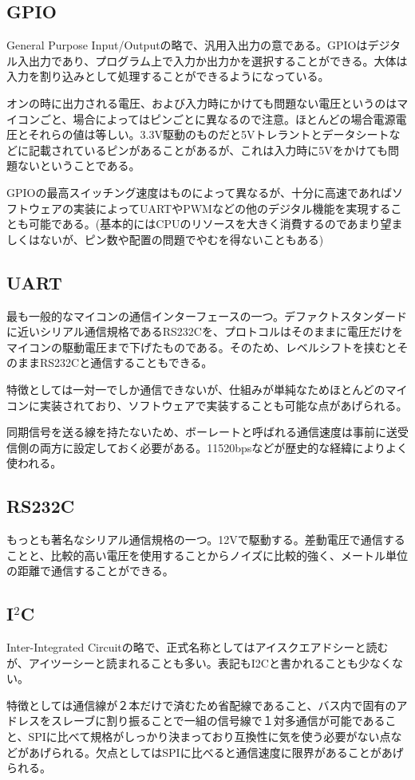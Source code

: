 \documentclass[a4paper,titlepage,here]{ujarticle}
\begin{document}
\subsection{GPIO}
General Purpose Input/Outputの略で、汎用入出力の意である。GPIOはデジタル入出力であり、プログラム上で入力か出力かを選択することができる。大体は入力を割り込みとして処理することができるようになっている。

オンの時に出力される電圧、および入力時にかけても問題ない電圧というのはマイコンごと、場合によってはピンごとに異なるので注意。ほとんどの場合電源電圧とそれらの値は等しい。3.3V駆動のものだと5Vトレラントとデータシートなどに記載されているピンがあることがあるが、これは入力時に5Vをかけても問題ないということである。

GPIOの最高スイッチング速度はものによって異なるが、十分に高速であればソフトウェアの実装によってUARTやPWMなどの他のデジタル機能を実現することも可能である。(基本的にはCPUのリソースを大きく消費するのであまり望ましくはないが、ピン数や配置の問題でやむを得ないこともある)
\subsection{UART}
最も一般的なマイコンの通信インターフェースの一つ。デファクトスタンダードに近いシリアル通信規格であるRS232Cを、プロトコルはそのままに電圧だけをマイコンの駆動電圧まで下げたものである。そのため、レベルシフトを挟むとそのままRS232Cと通信することもできる。

特徴としては一対一でしか通信できないが、仕組みが単純なためほとんどのマイコンに実装されており、ソフトウェアで実装することも可能な点があげられる。

同期信号を送る線を持たないため、ボーレートと呼ばれる通信速度は事前に送受信側の両方に設定しておく必要がある。11520bpsなどが歴史的な経緯によりよく使われる。
\subsection{RS232C}
もっとも著名なシリアル通信規格の一つ。12Vで駆動する。差動電圧で通信することと、比較的高い電圧を使用することからノイズに比較的強く、メートル単位の距離で通信することができる。
\subsection{I$^2$C}
Inter-Integrated Circuitの略で、正式名称としてはアイスクエアドシーと読むが、アイツーシーと読まれることも多い。表記もI2Cと書かれることも少なくない。

特徴としては通信線が２本だけで済むため省配線であること、バス内で固有のアドレスをスレーブに割り振ることで一組の信号線で１対多通信が可能であること、SPIに比べて規格がしっかり決まっており互換性に気を使う必要がない点などがあげられる。欠点としてはSPIに比べると通信速度に限界があることがあげられる。
\end{document}
